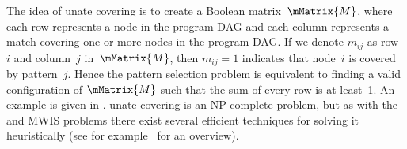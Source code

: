The idea of \gls{unate covering} is to create a Boolean matrix~$\mMatrix{M}$,
where each row represents a \gls{node} in the \gls{program DAG} and each column
represents a \gls{match} covering one or more \glspl{node} in the \gls{program
  DAG}.
%
If we denote $m_{ij}$ as row~$i$ and column~$j$ in~$\mMatrix{M}$, then
\mbox{$m_{ij} = 1$} indicates that \gls{node}~$i$ is covered by
\gls{pattern}~$j$.
%
Hence the \gls{pattern selection} problem is equivalent to
finding a valid configuration of $\mMatrix{M}$ such that the sum of every row is
at least~1.
%
An example is given in
.
%
\Gls{unate covering} is an \gls{NP complete}
problem, but as with the  and \glspl{MWIS problem} there
exist several efficient techniques for solving it heuristically (see for
example~\cite{Cordone2000, Goldberg2006} for an overview).

%
%

